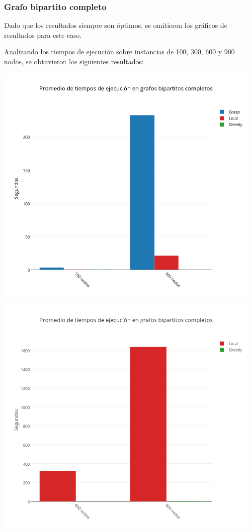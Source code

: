 \subsubsection{Grafo bipartito completo}

Dado que los resultados siempre son \'optimos, se omitieron los gr\'aficos de resultados para este caso.

Analizando los tiempos de ejecución sobre instancias de 100, 300, 600 y 900 nodos, se obtuvieron los siguientes resultados:

\begin{center}
 	\includegraphics[width=13cm, keepaspectratio=yes]{imagenes/coliseo/Bipartite1.png}

 	\includegraphics[width=13cm, keepaspectratio=yes]{imagenes/coliseo/Bipartite2.png}
\end{center}


